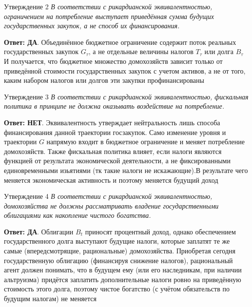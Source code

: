 \documentclass[10pt,a4paper]{article}
\newcommand{\qda}{\textbf{\color{yesgreen}Ответ: ДА}}
\newcommand{\qnet}{\textbf{\color{nored}Ответ: НЕТ}}
\newenvironment{answer}[2]{%
  \begin{qbox}{Утверждение #1}
  \textit{#2}\par\smallskip
}{%
  \end{qbox}\vspace{2pt}
}
\begin{document}
\begin{answer}{2}{В соответствии с рикардианской эквивалентностью, ограничением на потребление выступает приведённая сумма будущих государственных закупок, а не способ их финансирования.}
\qda. Объединённое бюджетное ограничение содержит поток реальных государственных закупок $G_\tau$, а не отдельные величины налогов $T_\tau$ или долга $B_\tau$
И получается, что бюджетное множество домохозяйств зависит только от приведённой стоимости государственных закупок с учетом активов, а не от того, каким набором налогов или долгов эти закупки профинансированы
\end{answer}

\begin{answer}{3}{В соответствии с рикардианской эквивалентностью, фискальная политика в принципе не должна оказывать воздействие на потребление.}
\qnet. Эквивалентность утверждает нейтральность лишь способа финансирования данной траектории госзакупок. Само изменение уровня и траектории $G$ напрямую входит в бюджетное ограничение и меняет потребление домохозяйств. Также фискальная политика влияет, если налоги являются функцией от результата экономической деятельности, а не фиксированными единовременными изьятиями (тк такие налоги не искажающие).В результате чего меняется экономическая активность и поэтому меняется будущий доход
\end{answer}

\begin{answer}{4}{В соответствии с рикардианской эквивалентностью, домохозяйства не должны рассматривать владение государственными облигациями как накопление чистого богатства.}
\qda. Облигации $B_t$ приносят процентный доход, однако обеспечением государственного долга выступают будущие налоги, которые заплатят те же самые (впередсмотрящие, рациональные) домохозяйства. Приобретая сегодня государственную облигацию (финансируя снижение налогов), рациональный агент должен понимать, что в будущем ему (или его наследникам, при наличии альтруизма) придётся заплатить дополнительные налоги ровно на приведённую стоимость этого долга, поэтому чистое богатство (с учётом обязательств по будущим налогам) не меняется
\end{answer}
\end{document}

